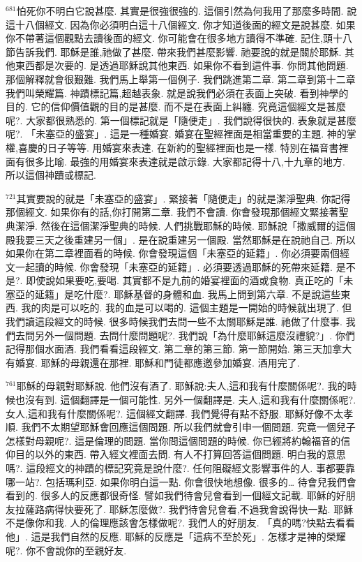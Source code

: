\documentclass{book}
\begin{document}
$^{681}$怕死你不明白它說甚麼.
其實是很強很強的.
這個引然為何我用了那麼多時間.
說這十八個經文.
因為你必須明白這十八個經文.
你才知道後面的經文是說甚麼.
如果你不帶著這個觀點去讀後面的經文.
你可能會在很多地方讀得不準確.
記住,頭十八節告訴我們.
耶穌是誰,祂做了甚麼.
帶來我們甚麼影響.
祂要說的就是關於耶穌.
其他東西都是次要的.
是透過耶穌說其他東西.
如果你不看到這件事.
你問其他問題.
那個解釋就會很艱難.
我們馬上舉第一個例子.
我們跳進第二章.
第二章到第十二章我們叫榮耀篇.
神蹟標記篇,超越表象.
就是說我們必須在表面上突破.
看到神學的目的.
它的信仰價值觀的目的是甚麼.
而不是在表面上糾纏.
究竟這個經文是甚麼呢?.
大家都很熟悉的.
第一個標記就是「隨便走」.
我們說得很快的.
表象就是甚麼呢?.
「未塞亞的盛宴」.
這是一種婚宴.
婚宴在聖經裡面是相當重要的主題.
神的掌權,喜慶的日子等等.
用婚宴來表達.
在新約的聖經裡面也是一樣.
特別在福音書裡面有很多比喻.
最強的用婚宴來表達就是啟示錄.
大家都記得十八,十九章的地方.
所以這個神蹟或標記.

$^{721}$其實要說的就是「未塞亞的盛宴」.
緊接著「隨便走」的就是潔淨聖典.
你記得那個經文.
如果你有的話,你打開第二章.
我們不會讀.
你會發現那個經文緊接著聖典潔淨.
然後在這個潔淨聖典的時候.
人們挑戰耶穌的時候.
耶穌說「撒威爾的這個殿我要三天之後重建另一個」.
是在說重建另一個殿.
當然耶穌是在說祂自己.
所以如果你在第二章裡面看的時候.
你會發現這個「未塞亞的延籍」.
你必須要兩個經文一起讀的時候.
你會發現「未塞亞的延籍」.
必須要透過耶穌的死帶來延籍.
是不是?.
即使說如果要吃,要喝.
其實都不是九前的婚宴裡面的酒或食物.
真正吃的「未塞亞的延籍」是吃什麼?.
耶穌基督的身體和血.
我馬上問到第六章.
不是說這些東西.
我的肉是可以吃的.
我的血是可以喝的.
這個主題是一開始的時候就出現了.
但我們讀這段經文的時候.
很多時候我們去問一些不太關耶穌是誰.
祂做了什麼事.
我們去問另外一個問題.
去問什麼問題呢?.
我們說「為什麼耶穌這麼沒禮貌?」.
你們記得那個水面酒.
我們看看這段經文.
第二章的第三節.
第一節開始.
第三天加拿大有婚宴.
耶穌的母親還在那裡.
耶穌和門徒都應邀參加婚宴.
酒用完了.

$^{761}$耶穌的母親對耶穌說.
他們沒有酒了.
耶穌說:夫人,這和我有什麼關係呢?.
我的時候也沒有到.
這個翻譯是一個可能性.
另外一個翻譯是.
夫人,這和我有什麼關係呢?.
女人,這和我有什麼關係呢?.
這個經文翻譯.
我們覺得有點不舒服.
耶穌好像不太孝順.
我們不太期望耶穌會回應這個問題.
所以我們就會引申一個問題.
究竟一個兒子怎樣對母親呢?.
這是倫理的問題.
當你問這個問題的時候.
你已經將約翰福音的信仰目的以外的東西.
帶入經文裡面去問.
有人不打算回答這個問題.
明白我的意思嗎?.
這段經文的神蹟的標記究竟是說什麼?.
任何阻礙經文影響事件的人.
事都要靠哪一站?.
包括瑪利亞.
如果你明白這一點.
你會很快地想像.
很多的… 待會兒我們會看到的.
很多人的反應都很奇怪.
譬如我們待會兒會看到一個經文記載.
耶穌的好朋友拉薩路病得快要死了.
耶穌怎麼做?.
我們待會兒會看,不過我會說得快一點.
耶穌不是像你和我.
人的倫理應該會怎樣做呢?.
我們人的好朋友.
「真的嗎?快點去看看他」.
這是我們自然的反應.
耶穌的反應是「這病不至於死」.
怎樣才是神的榮耀呢?.
你不會說你的至親好友.
\end{document}
